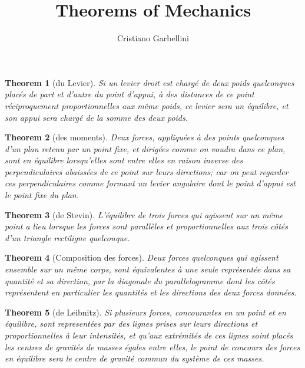 \documentclass[a4paper,11pt]{article}
\author{Cristiano Garbellini}
\title{Theorems of Mechanics}
\theoremstyle{plain}
\newtheorem{theorem}{Theorem}
\begin{document}
\maketitle

\begin{theorem}[du Levier]	
Si un levier droit est chargé de deux poids quelconques placés de part et d'autre du point
d'appui, à des distances de ce point réciproquement proportionnelles aux même poids,
ce levier sera un équilibre, et son appui sera chargé de la somme des deux poids.
\end{theorem}

\begin{theorem}[des moments]
Deux forces, appliquées à des points quelconques d'un plan retenu par un point fixe, et
dirigées comme on voudra dans ce plan, sont en équilibre lorsqu'elles sont entre elles
en raison inverse des perpendiculaires abaissées de ce point sur leurs directions; car
on peut regarder ces perpendiculaires comme formant un levier angulaire dont le point
d'appui est le point fixe du plan.
\end{theorem}

\begin{theorem}[de Stevin]
L'équilibre de trois forces qui agissent sur un même point a lieu lorsque les forces sont
parallèles et proportionnelles aux trois côtés d'un triangle rectiligne quelconque.
\end{theorem}

\begin{theorem}[Composition des forces]
Deux forces quelconques qui agissent ensemble sur un même corps, sont équivalentes à
une seule représentée dans sa quantité et sa direction, par la diagonale du parallelogramme
dont les côtés représentent en particulier les quantités et les directions des deux forces
données.
\end{theorem}

\begin{theorem}[de Leibnitz]
Si plusieurs forces, concourantes en un point et en équilibre, sont representées par des
lignes prises sur leurs directions et proportionnelles à leur intensités, et qu'aux extrémités
de ces lignes soint placés les centres de gravités de masses égales entre elles, le point de
concours des forces en équilibre sera le centre de gravité commun du système de ces
masses.
\end{theorem}
\end{document}

